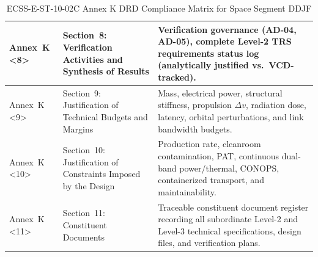 \begin{table}[H]
{\begin{tabularx}{\textwidth}{|>{\raggedright\arraybackslash}p{2.6cm}|>{\raggedright\arraybackslash}p{4.2cm}|>{\raggedright\arraybackslash}X|}
    Annex~K \textless8\textgreater & Section~8: Verification Activities and Synthesis of Results & Verification governance (\textbf{AD-04}, \textbf{AD-05}), complete Level-2 TRS requirements status log (analytically justified vs.\ VCD-tracked). \\ \hline
    Annex~K \textless9\textgreater & Section~9: Justification of Technical Budgets and Margins & Mass, electrical power, structural stiffness, propulsion $\Delta v$, radiation dose, latency, orbital perturbations, and link bandwidth budgets. \\ \hline
    Annex~K \textless10\textgreater & Section~10: Justification of Constraints Imposed by the Design & Production rate, cleanroom contamination, PAT, continuous dual-band power/thermal, CONOPS, containerized transport, and maintainability. \\ \hline
    Annex~K \textless11\textgreater & Section~11: Constituent Documents & Traceable constituent document register recording all subordinate Level-2 and Level-3 technical specifications, design files, and verification plans. \\ \hline
\end{tabularx}}
\caption{ECSS-E-ST-10-02C Annex K DRD Compliance Matrix for Space Segment DDJF}
\label{tab:ecss_annex_k_mapping}
\end{table}
